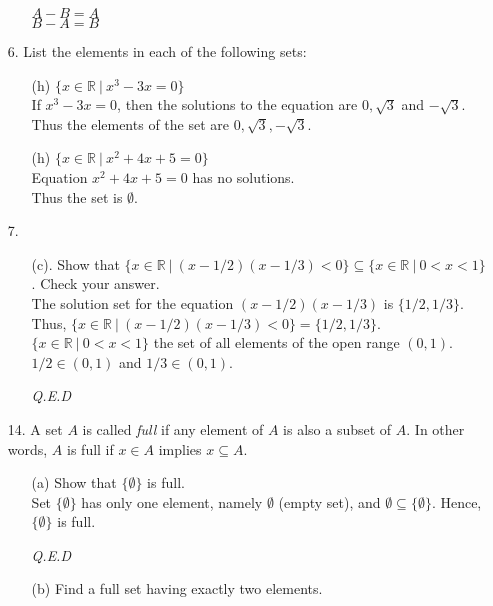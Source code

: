 \documentclass[12pt, a4paper]{article}                  %
\begin{document}
\begin{enumerate}
\begin{enumerate}
$A - B = A$\\
$B - A = B$
\end{enumerate}

\item[6.]
List the elements in each of the following sets:
\begin{enumerate}
\item[(h)]
$\{x \in \mathbb{R} \ \vert \ x^3 - 3x = 0\}$\\

If $x^3 - 3x = 0$, then the solutions to the equation
are $0,\sqrt{3}$ and $-\sqrt{3}$.\\
Thus the elements of the set are $0,\sqrt{3},-\sqrt{3}$.
\\
\item[(h)]
$\{x \in \mathbb{R} \ \vert \ x^2 + 4x + 5 = 0\}$\\

Equation $x^2 + 4x + 5 = 0$ has no solutions.\\
Thus the set is $\emptyset$.
\\
\end{enumerate}

\item[7.]
\begin{enumerate}
\item[(c).]
Show that $\{x \in \mathbb{R} \ \vert \ (x-1/2)(x-1/3)<0\} \subseteq \{x \in \mathbb{R} \ \vert \ 0 < x < 1\}$.
Check your answer.\\

The solution set for the equation $(x-1/2)(x-1/3)$ is $\{1/2,1/3\}$. Thus, $\{x \in \mathbb{R} \ \vert \ (x-1/2)(x-1/3)<0\} = \{1/2,1/3\}$.
$\{x \in \mathbb{R} \ \vert \ 0 < x < 1\}$ the set of all elements of the open range $(0,1)$.
$1/2 \in (0,1)$ and $1/3 \in (0,1)$.
\begin{flushright}
\textit{Q.E.D}
\end{flushright}
\end{enumerate}

\item[14.]
A set $A$ is called \textit{full} if any element of $A$ is also a subset of $A$.
In other words, $A$ is full if $x \in A$ implies $x \subseteq A$.
\begin{enumerate}
\item[(a)]
Show that $\{\emptyset\}$ is full.\\

Set $\{\emptyset\}$ has only one element, namely $\emptyset$ (empty set), and $\emptyset \subseteq \{\emptyset\}$.
Hence, $\{\emptyset\}$ is full.
\begin{flushright}
\textit{Q.E.D}
\end{flushright}
\item[(b)]
Find a full set having exactly two elements.\\


\end{enumerate}
\end{enumerate}
\end{document}
